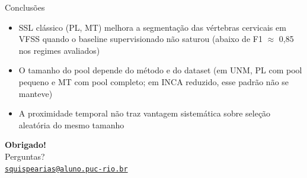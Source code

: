 \documentclass[aspectratio=169]{beamer}
\newcounter{finalframe}
\begin{document}
\begin{frame}{Conclusões}
  \begin{itemize}
    \item SSL clássico (PL, MT) melhora a segmentação das vértebras cervicais em VFSS quando o baseline supervisionado não saturou (abaixo de F1 $\approx$ 0,85 nos regimes avaliados)
    \medskip
    \item O tamanho do pool depende do método e do dataset (em UNM, PL com pool pequeno e MT com pool completo; em INCA reduzido, esse padrão não se manteve)
    \medskip
    \item A proximidade temporal não traz vantagem sistemática sobre seleção aleatória do mesmo tamanho
  \end{itemize}

\end{frame}


\begin{frame}
  \centering
  \vfill
  {\Huge \textbf{Obrigado!}}\\[0.6em]
  {\large Perguntas?}\\[1.4em]
  \href{mailto:squispearias@aluno.puc-rio.br}{\texttt{squispearias@aluno.puc-rio.br}}\\[1.2em]
\end{frame}



\setcounter{finalframe}{\value{framenumber}}

\setcounter{framenumber}{\value{finalframe}}
\end{document}
